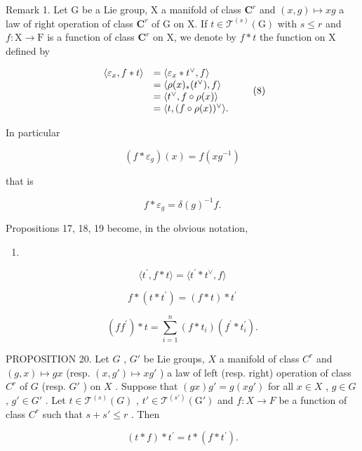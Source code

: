 Remark 1. Let G be a Lie group, X a manifold of class \(\mathbf{C}^r\) and \((x,g)\mapsto xg\) a law of right operation of class \(\mathbf{C}^r\) of G on X. If \(t\in \mathcal{T}^{(s)}(\mathrm{G})\) with \(s\leqslant r\) and \(f\colon \mathrm{X}\to \mathrm{F}\) is a function of class \(\mathbf{C}^r\) on X, we denote by \(f*t\) the function on X defined by

\[
\begin{array}{r l} \langle \varepsilon_ {x}, f * t \rangle & = \langle \varepsilon_ {x} * t ^ {\vee}, f \rangle \\ & = \langle \rho (x) _ {*} (t ^ {\vee}), f \rangle \\ & = \langle t ^ {\vee}, f \circ \rho (x) \rangle \\ & = \langle t, (f \circ \rho (x)) ^ {\vee} \rangle . \end{array}\tag{8}
\]

In particular

\[
(f * \varepsilon_ {g}) (x) = f (x g ^ {- 1})\tag{9}
\]

that is

\[
f * \varepsilon_ {g} = \delta (g) ^ {- 1} f.\tag{10}
\]

Propositions 17, 18, 19 become, in the obvious notation,

\begin{enumerate}
\def\labelenumi{(\arabic{enumi})}
\setcounter{enumi}{10}
\tightlist
\item
\end{enumerate}

\[
\langle t ^ {\prime}, f * t \rangle = \langle t ^ {\prime} * t ^ {\vee}, f \rangle\tag{11}
\]

\[
f * (t * t ^ {\prime}) = (f * t) * t ^ {\prime}\tag{12}
\]

\[
(f f ^ {\prime}) * t = \sum_ {i = 1} ^ {n} (f * t _ {i}) (f ^ {\prime} * t _ {i} ^ {\prime}).\tag{13}
\]

PROPOSITION 20. Let \(G\) , \(G'\) be Lie groups, \(X\) a manifold of class \(C^r\) and \((g, x) \mapsto gx\) (resp. \((x, g') \mapsto xg'\) ) a law of left (resp. right) operation of class \(C^r\) of \(G\) (resp. \(G'\) ) on \(X\) . Suppose that \((gx)g' = g(xg')\) for all \(x \in X\) , \(g \in G\) , \(g' \in G'\) . Let \(t \in \mathcal{T}^{(s)}(G)\) , \(t' \in \mathcal{T}^{(s')}(\mathrm{G}')\) and \(f: X \to F\) be a function of class \(C^r\) such that \(s + s' \leqslant r\) . Then

\[
(t * f) * t ^ {\prime} = t * (f * t ^ {\prime}).
\]

